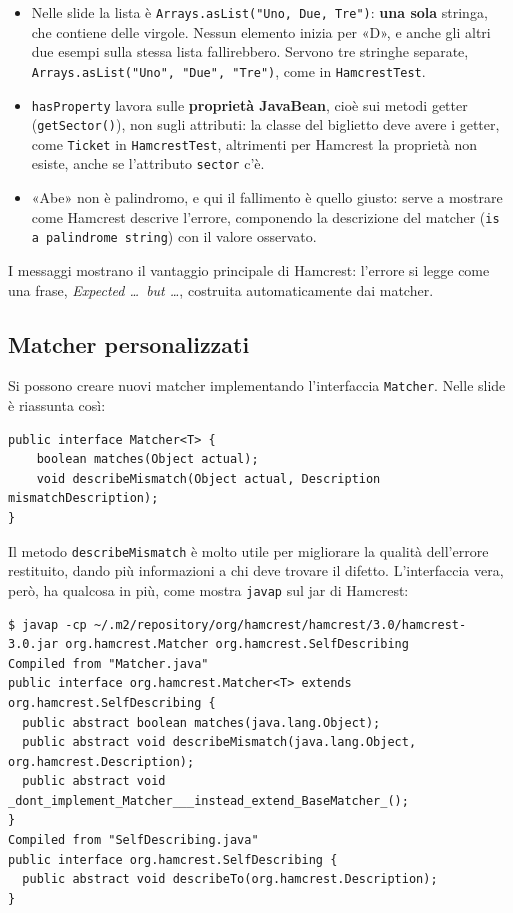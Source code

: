 \begin{itemize}
  \item Nelle slide la lista è \texttt{Arrays.asList("Uno, Due, Tre")}: \textbf{una sola} stringa, che contiene delle
        virgole. Nessun elemento inizia per «D», e anche gli altri due esempi sulla stessa lista fallirebbero. Servono
        tre stringhe separate, \texttt{Arrays.asList("Uno", "Due", "Tre")}, come in \texttt{HamcrestTest}.
  \item \texttt{hasProperty} lavora sulle \textbf{proprietà JavaBean}, cioè sui metodi getter (\texttt{getSector()}),
        non sugli attributi: la classe del biglietto deve avere i getter, come \texttt{Ticket} in \texttt{HamcrestTest},
        altrimenti per Hamcrest la proprietà non esiste, anche se l'attributo \texttt{sector} c'è.
  \item «Abe» non è palindromo, e qui il fallimento è quello giusto: serve a mostrare come Hamcrest descrive l'errore,
        componendo la descrizione del matcher (\texttt{is a palindrome string}) con il valore osservato.
\end{itemize}

I messaggi mostrano il vantaggio principale di Hamcrest: l'errore si legge come una frase, \textit{Expected \ldots\ but
\ldots}, costruita automaticamente dai matcher.

\subsection{Matcher personalizzati}

Si possono creare nuovi matcher implementando l'interfaccia \texttt{Matcher}. Nelle slide è riassunta così:

\begin{lstlisting}[style=java]
public interface Matcher<T> {
    boolean matches(Object actual);
    void describeMismatch(Object actual, Description mismatchDescription);
}
\end{lstlisting}

Il metodo \texttt{describeMismatch} è molto utile per migliorare la qualità dell'errore restituito, dando più
informazioni a chi deve trovare il difetto. L'interfaccia vera, però, ha qualcosa in più, come mostra \texttt{javap}
sul jar di Hamcrest:

\begin{lstlisting}[style=shell, name=Terminale, deletekeywords={java}]
$ javap -cp ~/.m2/repository/org/hamcrest/hamcrest/3.0/hamcrest-3.0.jar org.hamcrest.Matcher org.hamcrest.SelfDescribing
Compiled from "Matcher.java"
public interface org.hamcrest.Matcher<T> extends org.hamcrest.SelfDescribing {
  public abstract boolean matches(java.lang.Object);
  public abstract void describeMismatch(java.lang.Object, org.hamcrest.Description);
  public abstract void _dont_implement_Matcher___instead_extend_BaseMatcher_();
}
Compiled from "SelfDescribing.java"
public interface org.hamcrest.SelfDescribing {
  public abstract void describeTo(org.hamcrest.Description);
}
\end{lstlisting}

